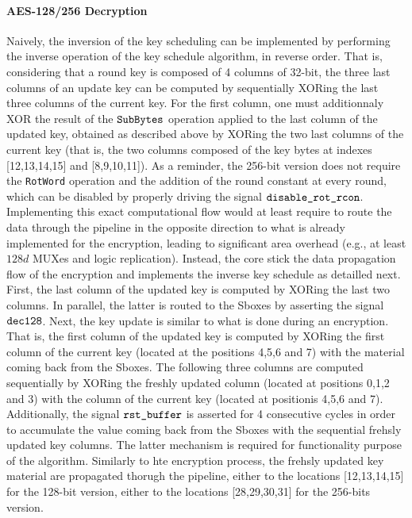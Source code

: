 \documentclass{scrartcl}
\begin{document}
\paragraph{AES-128/256 Decryption} Naively, the inversion of the key scheduling can be implemented by performing
the inverse operation of the key schedule algorithm, in reverse order. That is,
considering that a round key is composed of 4 columns of 32-bit, the three last
columns of an update key can be computed by sequentially XORing the last three
columns of the current key.  For the first column, one must additionnaly XOR
the result of the $\texttt{SubBytes}$ operation applied to the last column of the updated
key, obtained as described above by XORing the two last columns of the current
key (that is, the two columns composed of the key bytes at indexes
[12,13,14,15] and [8,9,10,11]). As a reminder, the 256-bit version does not
require the \texttt{RotWord} operation and the addition of the round constant
at every round, which can be disabled by properly driving the signal
$\texttt{disable\_rot\_rcon}$. Implementing this exact computational flow would at
least require to route the data through the pipeline in the opposite direction
to what is already implemented for the encryption, leading to significant area
overhead (e.g., at least $128d$ MUXes and logic replication). Instead, the core
stick the data propagation flow of the encryption and implements the inverse
key schedule as detailled next. First, the last column of the updated key is
computed by XORing the last two columns. In parallel, the latter is routed to
the Sboxes by asserting the signal $\texttt{dec128}$.  Next, the key
update is similar to what is done during an encryption. That is, the first
column of the updated key is computed by XORing the first column of the current
key (located at the positions 4,5,6 and 7) with the material coming back from
the Sboxes. The following three columns are computed sequentially by XORing the
freshly updated column (located at positions 0,1,2 and 3) with the column of
the current key (located at positionis 4,5,6 and 7). Additionally, the signal
$\texttt{rst\_buffer}$ is asserted for 4 consecutive cycles in order to
accumulate the value coming back from the Sboxes with the sequential frehsly
updated key columns.  The latter mechanism is required for functionality
purpose of the algorithm. Similarly to hte encryption process, the frehsly
updated key material are propagated thorugh the pipeline, either to the
locations [12,13,14,15] for the 128-bit version, either to the locations
[28,29,30,31] for the 256-bits version. 
\end{document}
